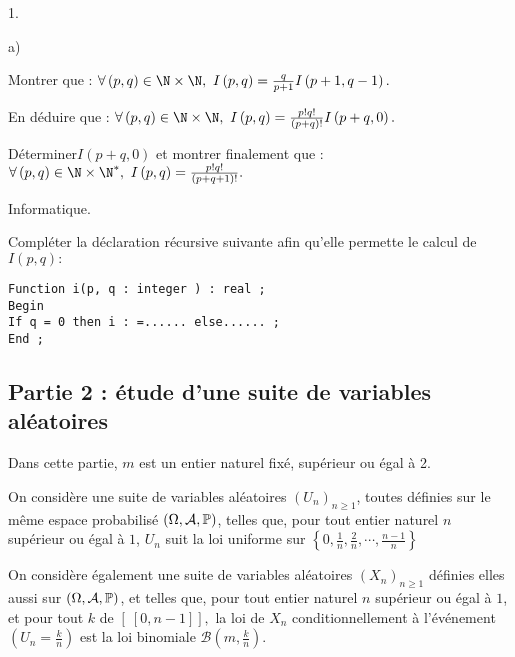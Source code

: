 \documentclass[11pt]{article}%
\begin{document}
\begin{noliste}{1.}
\begin{noliste}{a)}
 \setlength{\itemsep}{2mm}
\item Montrer que : $ \forall \left( p,q\right) \in \N\times \N,\
I\left( p,q\right) = \frac{q}{p + 1}I\left( p + 1,q-1\right). $

\item En déduire que : $ \forall \left( p,q\right) \in
\N\times \N,\ I\left( p,q\right) = \frac{p!q!}{\left(
p + q\right) !}I\left( p + q,0\right).$

\item Déterminer$I\left( p + q,0\right) $ et montrer finalement que : $
\forall \left( p,q\right) \in \N\times \N^{\ast },\ I\left( p,q\right)
= \frac{p!q!}{\left( p + q + 1\right) !}.$
\end{noliste}

\item Informatique.

Compléter la déclaration récursive suivante afin qu'elle
permette le calcul de $I\left( p,q\right) :$

\texttt{Function i(p, q : integer ) : real ;\\
Begin\\
If q = 0 then i : =...... else...... ; \\
End ;\\
}
\end{noliste}

\subsection*{Partie 2 : étude d'une suite de variables aléatoires}

Dans cette partie, $m$ est un entier naturel fixé, supérieur ou égal à
2.

On considère une suite de variables aléatoires $\left( U_{n}\right)
_{n\geq 1}$, toutes définies sur le même espace probabilisé $\left(
\Omega,\mathcal{A},\mathbb{P}\right) $, telles que, pour tout entier
naturel $n$ supérieur ou égal à $1$, $U_{n}$ suit la loi
uniforme sur $ \left\{
0,\frac{1}{n},\frac{2}{n},\cdots,\frac{n-1}{n}\right\} $

On considère également une suite de variables aléatoires $\left(
X_{n}\right)_{n\geq 1}$ définies elles aussi sur $\left(
\Omega,\mathcal{A},\mathbb{P}\right) $, et telles que, pour tout entier
naturel $n$
supérieur ou égal à $1$, et pour tout $k$ de $\left[ \ \left[
0,n-1\right] \right],$ la loi de $X_{n}$ conditionnellement à
l'événement $ \left( U_{n} = \frac{k}{n}\right) $ est la loi binomiale
$ \mathcal{B}\left( m,\frac{k}{n}\right) $.
\end{document}
